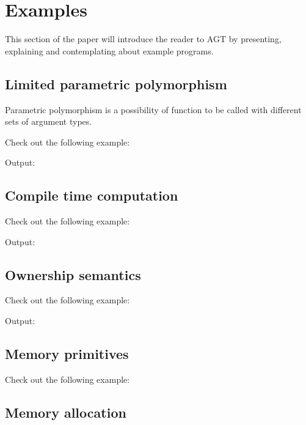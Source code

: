 \documentclass[times, utf8, diplomski]{fer}
\theoremstyle{definition}
\begin{document}
\chapter{Examples}

This section of the paper will introduce the reader to AGT by presenting, explaining and contemplating
about example programs.

\section{Limited parametric polymorphism}

Parametric polymorphism is a possibility of function to be called with different sets of argument types.

Check out the following example:


Output:



\section{Compile time computation}

Check out the following example:


Output:



\section{Ownership semantics}

Check out the following example:


Output:


\section{Memory primitives}

Check out the following example:


\section{Memory allocation}
\end{document}
